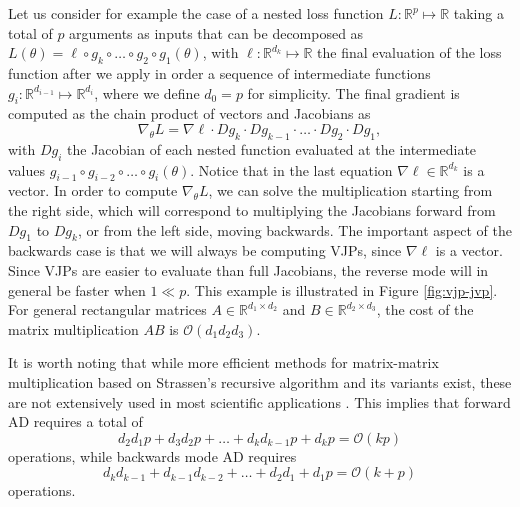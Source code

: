 Let us consider for example the case of a nested loss function $L : \mathbb R^p \mapsto \mathbb R$ taking a total of $p$ arguments as inputs that can be decomposed as $L(\theta) = \ell \circ g_{k} \circ \ldots \circ g_2 \circ g_1(\theta)$, with $\ell : \mathbb R^{d_k} \mapsto \mathbb R$ the final evaluation of the loss function after we apply in order a sequence of intermediate functions $g_i : \mathbb R^{d_{i-1}} \mapsto \mathbb R^{d_i}$, where we define $d_0 = p$ for simplicity. 
The final gradient is computed as the chain product of vectors and Jacobians as
\begin{equation}
 \nabla_\theta L = \nabla \ell \cdot Dg_{k} \cdot Dg_{k-1} \cdot \ldots \cdot Dg_2 \cdot Dg_1, 
\end{equation}
with $Dg_i$ the Jacobian of each nested function evaluated at the intermediate values $g_{i-1} \circ g_{i-2} \circ \ldots \circ g_i (\theta)$.
Notice that in the last equation $\nabla \ell \in \mathbb R^{d_k}$ is a vector.
In order to compute $\nabla_\theta L$, we can solve the multiplication starting from the right side, which will correspond to multiplying the Jacobians forward from $Dg_1$ to $Dg_k$, or from the left side, moving backwards. 
The important aspect of the backwards case is that we will always be computing VJPs, 
since $\nabla \ell$ is a vector.
Since VJPs are easier to evaluate than full Jacobians, the reverse mode will in general be faster when $1 \ll p$. This example is illustrated in Figure \ref{fig:vjp-jvp}. 
For general rectangular matrices $A\in \mathbb R^{d_1 \times d_2}$ and $B \in \mathbb R^{d_2 \times d_3}$, the cost of the matrix multiplication $AB$ is $\mathcal O (d_1 d_2 d_3)$.

It is worth noting that while more efficient methods for matrix-matrix multiplication based on Strassen’s recursive algorithm and its variants exist, these are not extensively used in most scientific applications \cite{Silva_Gustafson_Wong_2018, Huang_Smith_Henry_Geijn_2016}.
This implies that forward AD requires a total of
\begin{equation}
 d_2 d_1 p + d_3 d_2 p + \ldots + d_k d_{k-1} p + d_k p = \mathcal O (kp)
\end{equation}
operations, while backwards mode AD requires
\begin{equation}
 d_k d_{k-1} + d_{k-1} d_{k-2} + \ldots + d_2 d_1 + d_1 p = \mathcal O (k+p)
\end{equation}
operations. 


